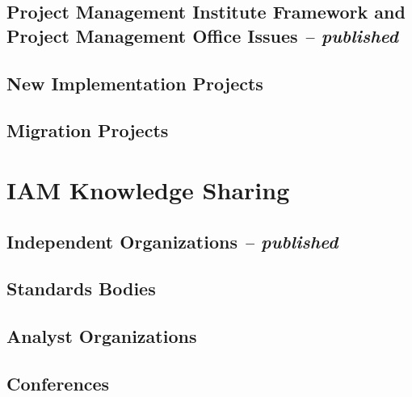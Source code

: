 \hypertarget{project-management-institute-framework-and-project-management-office-issues-published}{%
\section{\texorpdfstring{Project Management Institute Framework and
Project Management Office Issues \emph{--
published}}{Project Management Institute Framework and Project Management Office Issues -- published}}\label{project-management-institute-framework-and-project-management-office-issues-published}}

\hypertarget{new-implementation-projects}{%
\section{New Implementation
Projects}\label{new-implementation-projects}}

\hypertarget{migration-projects}{%
\section{Migration Projects}\label{migration-projects}}

\hypertarget{iam-knowledge-sharing}{%
\chapter{IAM Knowledge Sharing}\label{iam-knowledge-sharing}}

\hypertarget{independent-organizations-published}{%
\section{\texorpdfstring{Independent Organizations \emph{--
published}}{Independent Organizations -- published}}\label{independent-organizations-published}}

\hypertarget{standards-bodies}{%
\section{Standards Bodies}\label{standards-bodies}}

\hypertarget{analyst-organizations}{%
\section{Analyst Organizations}\label{analyst-organizations}}

\hypertarget{conferences}{%
\section{Conferences}\label{conferences}}

